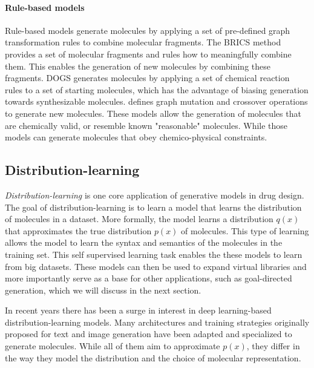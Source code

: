 \paragraph{Rule-based models}
Rule-based models generate molecules by applying a set of pre-defined graph transformation rules to
combine molecular fragments. The BRICS \citep{degenArtCompilingUsing2008} method provides a set of
molecular fragments and rules how to meaningfully combine them. This enables the generation of
new molecules by combining these fragments.
DOGS \citep{hartenfellerDOGSReactionDrivenNovo2012} generates molecules by applying a set of
chemical reaction rules to a set of starting molecules, which has the advantage of biasing
generation towards synthesizable molecules. \citet{jensenGraphbasedGeneticAlgorithm2019} defines graph mutation
and crossover operations to generate new molecules. These models allow the generation of molecules that are chemically valid, or resemble known
"reasonable" molecules. While those models can generate molecules that obey
chemico-physical constraints.



\subsection{Distribution-learning}
\emph{Distribution-learning} is one core application of generative models in drug design. The goal
of distribution-learning is to learn a model that learns the distribution of molecules in a dataset.
More formally, the model learns a distribution $q(x)$ that approximates the true distribution $p(x)$
of molecules. This type of learning allows the model to learn the syntax and semantics of the
molecules in the training set. This self supervised learning task enables the these models to learn
from big datasets. These models can then be used to expand virtual libraries and more importantly
serve as a base for other applications, such as goal-directed generation, which we will discuss in
the next section.

In recent years there has been a surge in interest in deep learning-based distribution-learning models.
Many architectures and training strategies originally proposed for text and image generation have
been adapted and specialized to generate molecules. While all of them aim to approximate $p(x)$, they
differ in the way they model the distribution and the choice of molecular representation.

